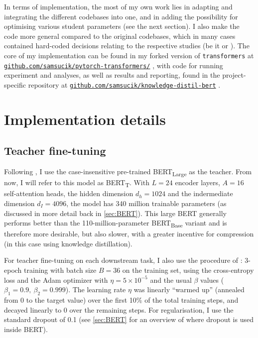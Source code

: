 \documentclass[bsc,frontabs,twoside,singlespacing,parskip,deptreport]{infthesis}
\def\BERTT{BERT\textsubscript{T}}
\newcommand\rurl[1]{%
  \href{https://#1}{\nolinkurl{#1}}%
}
\begin{document}
{{    In terms of implementation, the most of my own work lies in adapting and integrating the different codebases into one, and in adding the possibility for optimising various student parameters (see the next section). I also make the code more general compared to the original codebases, which in many cases contained hard-coded decisions relating to the respective studies (be it \citeauthor{Sanh_2019} or \citeauthor{Tang_2019b}). The core of my implementation can be found in my forked version of \verb|transformers| at \rurl{github.com/samsucik/pytorch-transformers/}, with code for running experiment and analyses, as well as results and reporting, found in the project-specific repository at \rurl{github.com/samsucik/knowledge-distil-bert}.
  }

  \section{Implementation details}{
    \label{sec:implementation-details}
    \subsection{Teacher fine-tuning}{
      Following \citet{Tang_2019b}, I use the case-insensitive pre-trained BERT\textsubscript{Large} as the teacher. 
      From now, I will refer to this model as \BERTT.
      With $L=24$ encoder layers, $A=16$ self-attention heads, the hidden dimension $d_h=1024$ and the indermediate dimension $d_I=4096$, the model has 340 million trainable parameters (as discussed in more detail back in \autoref{sec:BERT}).
      This large BERT generally performs better than the 110-million-parameter BERT\textsubscript{Base} variant and is therefore more desirable, but also slower, with a greater incentive for compression (in this case using knowledge distillation).

      For teacher fine-tuning on each downstream task, I also use the procedure of \citeauthor{Tang_2019b}:
      3-epoch training with batch size $B=36$ on the training set, using the cross-entropy loss and the Adam optimizer with $\eta=5\times10^{-5}$ and the usual $\beta$ values ($\beta_1=0.9,\ \beta_2=0.999$).
      The learning rate $\eta$ was linearly ``warmed up'' (annealed from 0 to the target value) over the first 10\% of the total training steps, and decayed linearly to 0 over the remaining steps.
      For regularisation, I use the standard dropout of 0.1 (see \autoref{sec:BERT} for an overview of where dropout is used inside BERT).

}}}
\end{document}
